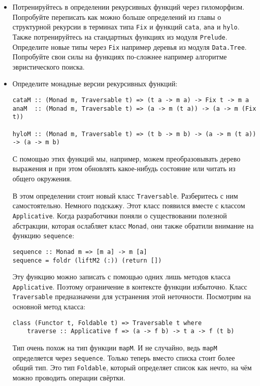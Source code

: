 \begin{itemize}
\item
  Потренируйтесь в определении рекурсивных функций через гиломорфизм.
  Попробуйте переписать как можно больше определений из главы о
  структурной рекурсии в терминах типа \texttt{Fix} и функций
  \texttt{cata}, \texttt{ana} и \texttt{hylo}. Также потренируйтесь на
  стандартных функциях из модуля \texttt{Prelude}. Определите новые типы
  через \texttt{Fix} например деревья из модуля \texttt{Data.Tree}.
  Попробуйте свои силы на функциях по-сложнее например алгоритме
  эвристического поиска.
\item
  Определите монадные версии рекурсивных функций:

\begin{verbatim}
cataM :: (Monad m, Traversable t) => (t a -> m a) -> Fix t -> m a
anaM  :: (Monad m, Traversable t) => (a -> m (t a)) -> (a -> m (Fix t))

hyloM :: (Monad m, Traversable t) => (t b -> m b) -> (a -> m (t a)) -> (a -> m b)
\end{verbatim}

  С помощью этих функций мы, например, можем преобразовывать дерево
  выражения и при этом обновлять какое-нибудь состояние или читать из
  общего окружения.

  В этом определении стоит новый класс \texttt{Traversable}. Разберитесь
  с ним самостоятельно. Немного подскажу. Этот класс появился вместе с
  классом \texttt{Applicative}. Когда разработчики поняли о
  существовании полезной абстракции, которая ослабляет класс
  \texttt{Monad}, они также обратили внимание на функцию
  \texttt{sequence}:

\begin{verbatim}
sequence :: Monad m => [m a] -> m [a]
sequence = foldr (liftM2 (:)) (return [])  
\end{verbatim}

  Эту функцию можно записать с помощью одних лишь методов класса
  \texttt{Applicative}. Поэтому ограничение в контексте функции
  избыточно. Класс \texttt{Traversable} предназначени для устранения
  этой неточности. Посмотрим на основной метод класса:

\begin{verbatim}
class (Functor t, Foldable t) => Traversable t where
    traverse :: Applicative f => (a -> f b) -> t a -> f (t b)
\end{verbatim}

  Тип очень похож на тип функции \texttt{mapM}. И не случайно, ведь
  \texttt{mapM} определяется через \texttt{sequence}. Только теперь
  вместо списка стоит более общий тип. Это тип \texttt{Foldable},
  который определяет список как нечто, на чём можно проводить операции
  свёртки.
\end{itemize}
